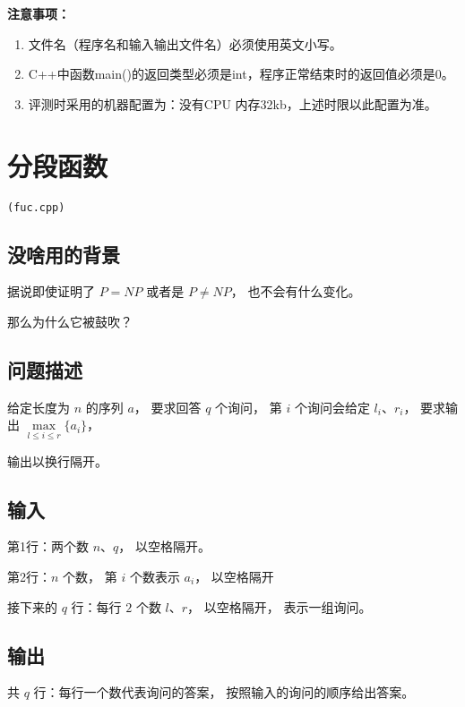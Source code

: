 \documentclass[UTF8]{ctexart}
\begin{document}
\textbf{注意事项：}
\begin{enumerate}
    \item{文件名（程序名和输入输出文件名）必须使用英文小写。}
    \item{C++中函数main()的返回类型必须是int，程序正常结束时的返回值必须是0。}
    \item{评测时采用的机器配置为：没有CPU 内存32kb，上述时限以此配置为准。}
\end{enumerate}

\newpage
\setcounter{page}{1}
\pagestyle{plain}

\newpage
\section{分段函数}
\begin{center}
\tt\large{(fuc.cpp)}
\end{center}

\subsection{没啥用的背景}

据说即使证明了 $P=NP$ 或者是 $P\neq NP$， 也不会有什么变化。

那么为什么它被鼓吹？

\subsection{问题描述}

给定长度为 $n$ 的序列 $a$， 要求回答 $q$ 个询问， 第 $i$ 个询问会给定 $l_i、r_i$， 要求输出 $\max\limits_{l\le i \le r} \lbrace a_i \rbrace$， 

输出以换行隔开。

\subsection{输入}

第1行：两个数 $n$、$q$， 以空格隔开。

第2行：$n$ 个数， 第 $i$ 个数表示 $a_i$， 以空格隔开

接下来的 $q$ 行：每行 $2$ 个数 $l$、$r$， 以空格隔开， 表示一组询问。

\subsection{输出}

共 $q$ 行：每行一个数代表询问的答案， 按照输入的询问的顺序给出答案。
\end{document}

